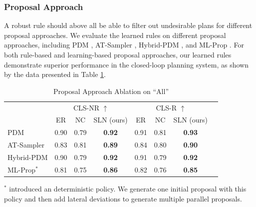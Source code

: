 \subsubsection{Proposal Approach}
\label{sec:proposal_approach}
A robust rule should above all be able to filter out undesirable plans for different proposal approaches.
We evaluate the learned rules on different proposal approaches, including PDM \cite{Dauner2023CORL}, AT-Sampler \cite{jiang2022efficient}, Hybrid-PDM \cite{Dauner2023CORL}, and ML-Prop \cite{scheel2022urban}. For both rule-based and learning-based proposal approaches, our learned rules demonstrate superior performance in the closed-loop planning system, as shown by the data presented in Table \ref{tab: proposal-approach-ablation}.
\begin{table}[h!]\centering
    \caption{Proposal Approach Ablation on ``All''}\label{tab: proposal-approach-ablation}
    \scriptsize
    \begin{tabular}{l|ccc|cccr}\toprule
                                             & \multicolumn{3}{c|}{CLS-NR $\uparrow$} & \multicolumn{3}{c}{CLS-R $\uparrow$}                                               \\\cmidrule{2-7}
                                             & ER                                     & NC                                   & SLN (ours)    & ER   & NC   & SLN (ours)    \\\midrule
        PDM \cite{Dauner2023CORL}            & 0.90                                   & 0.79                                 & \textbf{0.92} & 0.91 & 0.81 & \textbf{0.93} \\
        AT-Sampler \cite{jiang2022efficient} & 0.83                                   & 0.81                                 & \textbf{0.89} & 0.84 & 0.80 & \textbf{0.90} \\ \midrule
        Hybrid-PDM   \cite{Dauner2023CORL}   & 0.90                                   & 0.79                                 & \textbf{0.92} & 0.91 & 0.79 & \textbf{0.92} \\
        ML-Prop$^*$ \cite{scheel2022urban}   & 0.81                                   & 0.75                                 & \textbf{0.86} & 0.82 & 0.76 & \textbf{0.85} \\
        \bottomrule
    \end{tabular}
    \begin{tablenotes}
        \item $^*$ \cite{scheel2022urban} introduced an deterministic policy. We generate one initial proposal with this policy and then add lateral deviations to generate multiple parallel proposals.
    \end{tablenotes}
\end{table}

